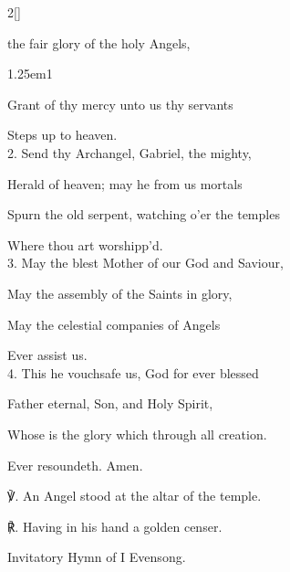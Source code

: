 \begin{paracol}{2}[]
\sloppy

\firstEvensong
{}

\firstEvensongHymn

 the fair glory of the holy Angels,

\begin{hangparas}{1.25em}{1}

Grant of thy mercy unto us thy servants

Steps up to heaven.\\

2. Send thy Archangel, Gabriel, the mighty,

Herald of heaven; may he from us mortals

Spurn the old serpent, watching o'er the temples

Where thou art worshipp'd.\\

3. May the blest Mother of our God and Saviour,

May the assembly of the Saints in glory,

May the celestial companies of Angels

Ever assist us.\\

4. This he vouchsafe us, God for ever blessed

Father eternal, Son, and Holy Spirit,

Whose is the glory which through all creation.

Ever resoundeth. Amen.\\
\end{hangparas}

    ℣. An Angel stood at the altar of the temple.

	℟. Having in his hand a golden censer.
	
	
	\switchcolumn
	
\mattins
{}

\begin{rubric}
	Invitatory Hymn of I Evensong.
\end{rubric}


\end{paracol}
